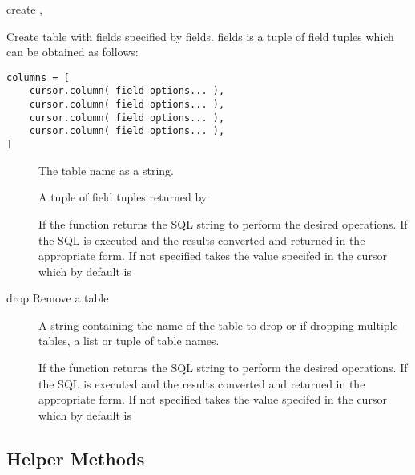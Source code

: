 \documentclass{howto}
\begin{document}
\begin{methoddesc}[cursor]{create}{ ,   }%

Create table with fields specified by fields. fields is a tuple of field tuples which can be obtained as follows:
\begin{verbatim}
columns = [
    cursor.column( field options... ),
    cursor.column( field options... ),
    cursor.column( field options... ),
    cursor.column( field options... ),
]
\end{verbatim}
\begin{description}
\item[]
The table name as a string. 
\item[]
A tuple of field tuples returned by 
\item[]
If  the function returns the SQL string to perform the desired operations. If  the SQL is executed and the results converted and returned in the appropriate form. If not specified takes the value specifed in the cursor which by default is 
\end{description}
\end{methoddesc}

\begin{methoddesc}[cursor]{drop}{  }%
Remove a table
\begin{description}
\item[]
A string containing the name of the table to drop or if dropping multiple tables, a list or tuple of table names.
\item[]
If  the function returns the SQL string to perform the desired operations. If  the SQL is executed and the results converted and returned in the appropriate form. If not specified takes the value specifed in the cursor which by default is 
\end{description}
\end{methoddesc}

\subsection{Helper Methods}
\end{document}

